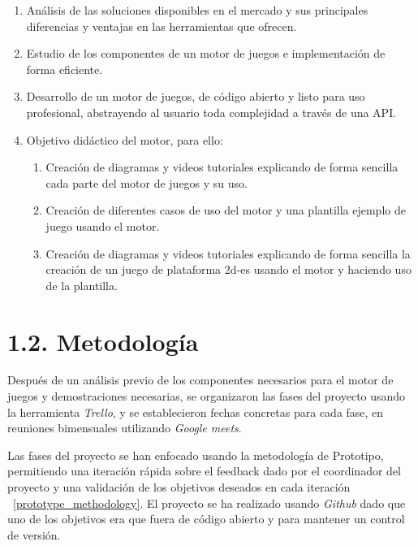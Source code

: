 \begin{enumerate}[label=\textbf{O\arabic*.}]
    \item Análisis de las soluciones disponibles en el mercado y sus principales diferencias y ventajas en las herramientas que ofrecen.
    \item Estudio de los componentes de un motor de juegos e implementación de forma eficiente.
    \item Desarrollo de un motor de juegos, de código abierto y listo para uso profesional, abstrayendo al usuario toda complejidad a través de una API.
    \item Objetivo didáctico del motor, para ello:
    \begin{enumerate}[label=\textbf{O4.\arabic*.}]
        \item Creación de diagramas y videos tutoriales explicando de forma sencilla cada parte del motor de juegos y su uso.
        \item Creación de diferentes casos de uso del motor y una plantilla ejemplo de juego usando el motor.
        \item Creación de diagramas y videos tutoriales explicando de forma sencilla la creación de un juego de plataforma
         \gls{2d-es} usando el motor y haciendo uso de la plantilla.
    \end{enumerate}
\end{enumerate}

\newpage

\section*{1.2. Metodología}\label{sec:methodology}

Después de un análisis previo de los componentes necesarios para el motor de juegos y demostraciones necesarias,
se organizaron las fases del proyecto usando la herramienta \textit{Trello}, y se establecieron fechas concretas para
cada fase, en reuniones bimensuales utilizando \textit{Google meets}.

Las fases del proyecto se han enfocado usando la metodología de Prototipo, permitiendo una iteración rápida
sobre el feedback dado por el coordinador del proyecto y una validación de los objetivos deseados en cada iteración \figurename~\ref{prototype_methodology}.
El proyecto se ha realizado usando \textit{Github} dado que uno de los objetivos era que fuera de código abierto y para
mantener un control de versión.

